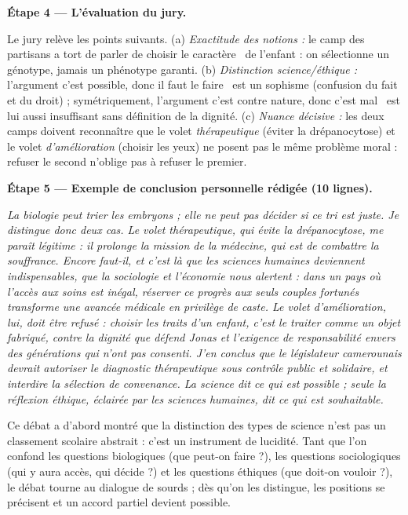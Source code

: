 \documentclass[11pt]{article}
\newcommand{\cle}[1]{{\popxbold\color{popdark}#1}}
\newcounter{popsec}
\newcounter{popsub}
\newcommand{\courssub}[1]{%
  \stepcounter{popsub}%
  \par\vspace{9pt}\noindent{\popxbold\fontsize{11.5}{13}\selectfont\color{popink}{\color{poporange}\thepopsec.\thepopsub}\hspace{6pt}#1}\par\nopagebreak\vspace{4pt}
}
\begin{document}
\begin{exoresolu}
\textbf{Étape 4 — L'évaluation du jury.}

Le jury relève les points suivants. (a) \emph{Exactitude des notions :} le camp des partisans a tort de parler de \guillemotleft choisir le caractère \guillemotright\ de l'enfant : on sélectionne un \cle{génotype}, jamais un \cle{phénotype} garanti. (b) \emph{Distinction science/éthique :} l'argument \guillemotleft c'est possible, donc il faut le faire \guillemotright\ est un sophisme (confusion du fait et du droit) ; symétriquement, l'argument \guillemotleft c'est contre nature, donc c'est mal \guillemotright\ est lui aussi insuffisant sans définition de la dignité. (c) \emph{Nuance décisive :} les deux camps doivent reconnaître que le volet \emph{thérapeutique} (éviter la drépanocytose) et le volet \emph{d'amélioration} (choisir les yeux) ne posent pas le même problème moral : refuser le second n'oblige pas à refuser le premier.

\textbf{Étape 5 — Exemple de conclusion personnelle rédigée (10 lignes).}

\emph{La biologie peut trier les embryons ; elle ne peut pas décider si ce tri est juste. Je distingue donc deux cas. Le volet thérapeutique, qui évite la drépanocytose, me paraît légitime : il prolonge la mission de la médecine, qui est de combattre la souffrance. Encore faut-il, et c'est là que les sciences humaines deviennent indispensables, que la sociologie et l'économie nous alertent : dans un pays où l'accès aux soins est inégal, réserver ce progrès aux seuls couples fortunés transforme une avancée médicale en privilège de caste. Le volet d'amélioration, lui, doit être refusé : choisir les traits d'un enfant, c'est le traiter comme un objet fabriqué, contre la dignité que défend Jonas et l'exigence de responsabilité envers des générations qui n'ont pas consenti. J'en conclus que le législateur camerounais devrait autoriser le diagnostic thérapeutique sous contrôle public et solidaire, et interdire la sélection de convenance. La science dit ce qui est possible ; seule la réflexion éthique, éclairée par les sciences humaines, dit ce qui est souhaitable.}
\end{exoresolu}

\courssub{Bilan de l'activité}

Ce débat a d'abord montré que la \cle{distinction des types de science} n'est pas un classement scolaire abstrait : c'est un instrument de lucidité. Tant que l'on confond les questions biologiques (que peut-on faire ?), les questions sociologiques (qui y aura accès, qui décide ?) et les questions éthiques (que doit-on vouloir ?), le débat tourne au dialogue de sourds ; dès qu'on les distingue, les positions se précisent et un accord partiel devient possible.
\end{document}

